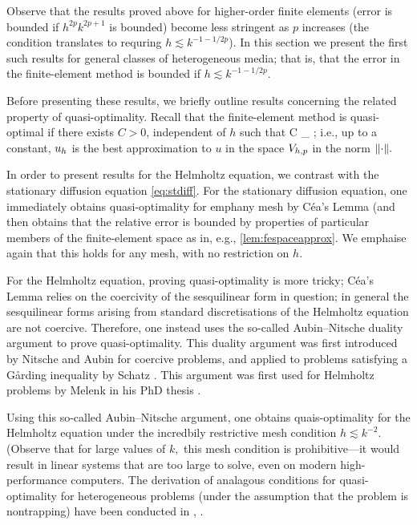 Observe that the results proved above for higher-order finite elements (error is bounded if $h^{2p}k^{2p+1}$ is bounded) become less stringent as $p$ increases (the condition translates to requring $h \lesssim k^{-1-1/2p}$). In this section we present the first such results for general classes of heterogeneous media; that is, that the error in the finite-element method is bounded if $h \lesssim k^{-1-1/2p}$.

Before presenting these results, we briefly outline results concerning the related property of quasi-optimality. Recall that the finite-element method is quasi-optimal if there exists $C>0$, independent of $h$ such that
\beqs
{} \leq C \inf_{\vh \in \Vhp} ;
\eeqs
i.e., up to a constant, $u_{h}$ is the best approximation to $u$ in the space $V_{h,p}$ in the norm $\N{\cdot}.$

In order to present results for the Helmholtz equation, we contrast with the stationary diffusion equation \eqref{eq:stdiff}. For the stationary diffusion equation, one immediately obtains quasi-optimality for emph{any} mesh by C\'ea's Lemma (and then obtains that the relative error is bounded by properties of particular members of the finite-element space as in, e.g., \cref{lem:fespaceapprox}. We emphaise again that this holds for any mesh, with no restriction on $h.$

For the Helmholtz equation, proving quasi-optimality is more tricky; C\'ea's Lemma relies on the coercivity of the sesquilinear form in question; in general the sesquilinear forms arising from standard discretisations of the Helmholtz equation are not coercive. Therefore, one instead uses the so-called Aubin--Nitsche duality argument to prove quasi-optimality. This duality argument was first introduced by Nitsche \cite{Ni:67} and Aubin \cite{Au:68} for coercive problems, and applied to problems satisfying a G\r{a}rding inequality by Schatz \cite{Sc:74}. This argument was first used for Helmholtz problems by Melenk in his PhD thesis \cite[Proposition 8.2.7]{Me:95}.

Using this so-called Aubin--Nitsche argument, one obtains quais-optimality for the Helmholtz equation under the incredbily restrictive mesh condition $h \lesssim k^{-2}.$ (Observe that for large values of $k,$ this mesh condition is prohibitive---it would result in linear systems that are too large to solve, even on modern high-performance computers. The derivation of analagous conditions for quasi-optimality for heterogeneous problems (under the assumption that the problem is nontrapping) have been conducted in \cite[Remark 4.4 b.]{GrSa:18}, \cite[Theorem 3]{GaSpWu:18}.


